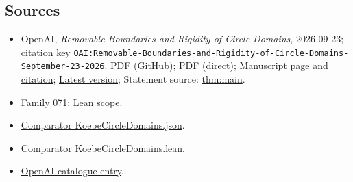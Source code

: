 \documentclass[11pt]{article}
\begin{document}
\subsection{Sources}
\begin{itemize}
\item OpenAI, \emph{Removable Boundaries and Rigidity of Circle Domains}, 2026-09-23; citation key \texttt{OAI:Removable-Boundaries-and-Rigidity-of-Circle-Domains-September-23-2026}. \href{https://github.com/openai/math/blob/adc7f1241b42e322a6451854ab7e4b4c146bf78a/preprints/Removable-Boundaries-and-Rigidity-of-Circle-Domains-September-23-2026/paper.pdf}{PDF (GitHub)}; \href{https://github.com/openai/math/raw/adc7f1241b42e322a6451854ab7e4b4c146bf78a/preprints/Removable-Boundaries-and-Rigidity-of-Circle-Domains-September-23-2026/paper.pdf}{PDF (direct)}; \href{https://github.com/openai/math/blob/adc7f1241b42e322a6451854ab7e4b4c146bf78a/preprints/Removable-Boundaries-and-Rigidity-of-Circle-Domains-September-23-2026/README.md}{Manuscript page and citation}; \href{https://github.com/openai/math/blob/main/preprints/Removable-Boundaries-and-Rigidity-of-Circle-Domains-September-23-2026/paper.pdf}{Latest version}; Statement source: \href{https://github.com/openai/math/blob/adc7f1241b42e322a6451854ab7e4b4c146bf78a/preprints/Removable-Boundaries-and-Rigidity-of-Circle-Domains-September-23-2026/build/sections/introduction.tex\#L22}{thm:main}.
\item Family 071: \href{https://github.com/openai/math/blob/adc7f1241b42e322a6451854ab7e4b4c146bf78a/lean/docs/071.md}{Lean scope}.
\item \href{https://github.com/openai/math/blob/adc7f1241b42e322a6451854ab7e4b4c146bf78a/lean/ComparatorChallenges/KoebeCircleDomains.json}{Comparator KoebeCircleDomains.json}.
\item \href{https://github.com/openai/math/blob/adc7f1241b42e322a6451854ab7e4b4c146bf78a/lean/ComparatorChallenges/KoebeCircleDomains.lean}{Comparator KoebeCircleDomains.lean}.
\item \href{https://github.com/openai/math/blob/adc7f1241b42e322a6451854ab7e4b4c146bf78a/CONTENTS.md}{OpenAI catalogue entry}.
\end{itemize}
\end{document}
